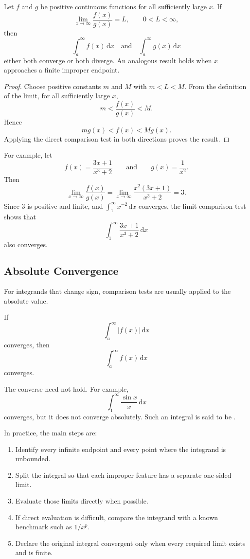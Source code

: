 \begin{theorem}
    Let \(f\) and \(g\) be positive continuous functions for all
    sufficiently large \(x\).  If
    \[
        \lim_{x\to\infty}\frac{f(x)}{g(x)}=L,
        \qquad 0<L<\infty,
    \]
    then
    \[
        \int_a^\infty f(x)\,\mathrm{d}x
        \quad\text{and}\quad
        \int_a^\infty g(x)\,\mathrm{d}x
    \]
    either both converge or both diverge.  An analogous result holds when
    \(x\) approaches a finite improper endpoint.
\end{theorem}
\begin{proof}
    Choose positive constants \(m\) and \(M\) with \(m<L<M\).  From the
    definition of the limit, for all sufficiently large \(x\),
    \[
        m<\frac{f(x)}{g(x)}<M.
    \]
    Hence
    \[
        m g(x)<f(x)<M g(x).
    \]
    Applying the direct comparison test in both directions proves the
    result.
\end{proof}

For example, let
\[
    f(x)=\frac{3x+1}{x^3+2}
    \qquad\text{and}\qquad
    g(x)=\frac1{x^2}.
\]
Then
\[
    \lim_{x\to\infty}\frac{f(x)}{g(x)}
    =\lim_{x\to\infty}\frac{x^2(3x+1)}{x^3+2}=3.
\]
Since \(3\) is positive and finite, and
\(\int_1^\infty x^{-2}\,\mathrm{d}x\) converges, the limit comparison test
shows that
\[
    \int_1^\infty\frac{3x+1}{x^3+2}\,\mathrm{d}x
\]
also converges.

\subsection{Absolute Convergence}

For integrands that change sign, comparison tests are usually applied to the
absolute value.

\begin{theorem}
    If
    \[
        \int_a^\infty |f(x)|\,\mathrm{d}x
    \]
    converges, then
    \[
        \int_a^\infty f(x)\,\mathrm{d}x
    \]
    converges.
\end{theorem}

The converse need not hold.  For example,
\[
    \int_1^\infty\frac{\sin x}{x}\,\mathrm{d}x
\]
converges, but it does not converge absolutely.  Such an integral is said to
be .

In practice, the main steps are:
\begin{enumerate}
    \item Identify every infinite endpoint and every point where the
    integrand is unbounded.
    \item Split the integral so that each improper feature has a separate
    one-sided limit.
    \item Evaluate those limits directly when possible.
    \item If direct evaluation is difficult, compare the integrand with a
    known benchmark such as \(1/x^p\).
    \item Declare the original integral convergent only when every required
    limit exists and is finite.
\end{enumerate}

